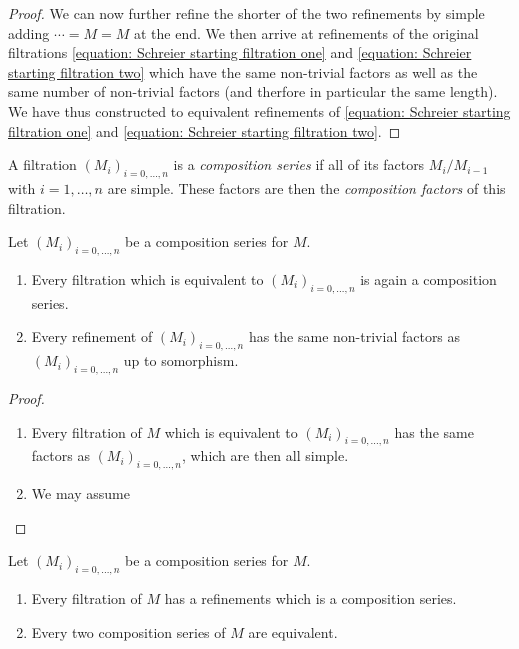 \begin{proof}
  We can now further refine the shorter of the two refinements by simple adding $\dotsb = M = M$ at the end.
  We then arrive at refinements of the original filtrations \eqref{equation: Schreier starting filtration one} and \eqref{equation: Schreier starting filtration two} which have the same non-trivial factors as well as the same number of non-trivial factors (and therfore in particular the same length).
  We have thus constructed to equivalent refinements of \eqref{equation: Schreier starting filtration one} and \eqref{equation: Schreier starting filtration two}.
\end{proof}


\begin{definition}
  A filtration $(M_i)_{i = 0, \dotsc, n}$ is a \emph{composition series} if all of its factors $M_i/M_{i-1}$ with $i = 1, \dotsc, n$ are simple.
  These factors are then the \emph{composition factors} of this filtration.
\end{definition}


\begin{lemma}
  \label{lemma: preparation for Jordan Hoelder}
  Let $(M_i)_{i = 0, \dotsc, n}$ be a composition series for $M$.
  \begin{enumerate}
    \item
      Every filtration which is equivalent to $(M_i)_{i = 0, \dotsc, n}$ is again a composition series.
    \item
      Every refinement of $(M_i)_{i = 0, \dotsc, n}$ has the same non-trivial factors as $(M_i)_{i = 0, \dotsc, n}$ up to somorphism.
  \end{enumerate}
\end{lemma}


\begin{proof}
  \leavevmode
  \begin{enumerate}
    \item
      Every filtration of $M$ which is equivalent to $(M_i)_{i = 0, \dotsc, n}$ has the same factors as $(M_i)_{i = 0, \dotsc, n}$, which are then all simple.
    \item
      We may assume
  \end{enumerate}
\end{proof}



\begin{theorem}
  Let $(M_i)_{i = 0, \dotsc, n}$ be a composition series for $M$.
  \begin{enumerate}
    \item
      Every filtration of $M$ has a refinements which is a composition series.
    \item
      Every two composition series of $M$ are equivalent.
  \end{enumerate}
\end{theorem}


